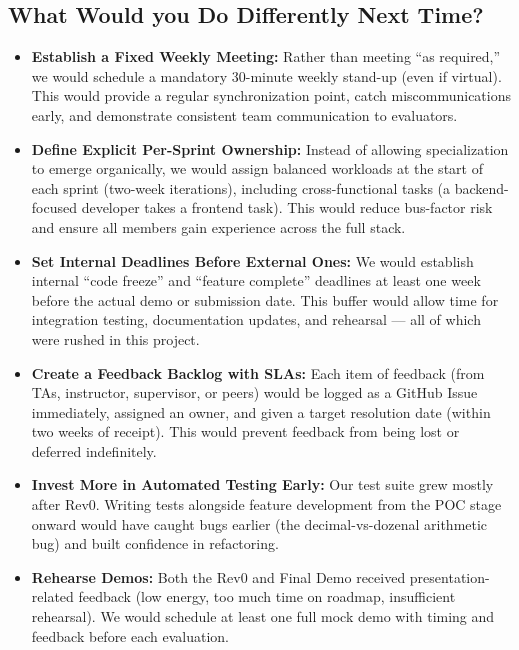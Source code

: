 \documentclass{article}
\begin{document}
\subsection{What Would you Do Differently Next Time?}

\begin{itemize}
  \item \textbf{Establish a Fixed Weekly Meeting:} Rather than meeting ``as required,'' we would schedule a mandatory 30-minute weekly stand-up (even if virtual). This would provide a regular synchronization point, catch miscommunications early, and demonstrate consistent team communication to evaluators.

  \item \textbf{Define Explicit Per-Sprint Ownership:} Instead of allowing specialization to emerge organically, we would assign balanced workloads at the start of each sprint (two-week iterations), including cross-functional tasks (a backend-focused developer takes a frontend task). This would reduce bus-factor risk and ensure all members gain experience across the full stack.

  \item \textbf{Set Internal Deadlines Before External Ones:} We would establish internal ``code freeze'' and ``feature complete'' deadlines at least one week before the actual demo or submission date. This buffer would allow time for integration testing, documentation updates, and rehearsal --- all of which were rushed in this project.

  \item \textbf{Create a Feedback Backlog with SLAs:} Each item of feedback (from TAs, instructor, supervisor, or peers) would be logged as a GitHub Issue immediately, assigned an owner, and given a target resolution date (within two weeks of receipt). This would prevent feedback from being lost or deferred indefinitely.

  \item \textbf{Invest More in Automated Testing Early:} Our test suite grew mostly after Rev0. Writing tests alongside feature development from the POC stage onward would have caught bugs earlier (the decimal-vs-dozenal arithmetic bug) and built confidence in refactoring.

  \item \textbf{Rehearse Demos:} Both the Rev0 and Final Demo received presentation-related feedback (low energy, too much time on roadmap, insufficient rehearsal). We would schedule at least one full mock demo with timing and feedback before each evaluation.
\end{itemize}
\end{document}
